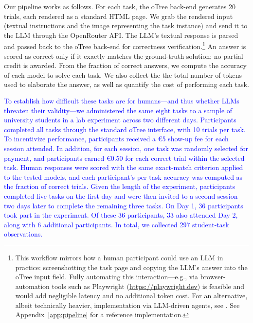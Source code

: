 \documentclass[12pt,a4paper]{article}
\newcommand{\blue}[1]{\textcolor{blue}{#1}}
\begin{document}
Our pipeline works as follows. For each task, the oTree back-end generates 20 trials, each rendered as a standard HTML page. We grab the rendered input (textual instructions and the image representing the task instance) and send it to the LLM through the OpenRouter API. The LLM's textual response is parsed and passed back to the oTree back-end for correctness 
verification.\footnote{This workflow mirrors how a human participant could use an LLM in practice: screenshotting the task page and copying the LLM's answer into the oTree input field. Fully automating this interaction---e.g., via browser-automation tools such as Playwright (\url{https://playwright.dev}) is feasible
and would add negligible latency and no additional token cost.
For an alternative, albeit technically heavier, implementation via LLM-driven agents, see \citet{celebi2026mission}. See Appendix~\ref{app:pipeline} for a reference implementation.}
An answer is scored as correct only if it exactly matches the ground-truth solution; no partial credit is awarded. From the fraction of correct answers, we compute the accuracy of each model to solve each task. We also collect the
the total number of tokens used to elaborate the answer, as well as quantify the cost of performing each task.

\blue{To establish how difficult these tasks are for humans---and thus whether LLMs threaten their validity---we administered the same eight tasks to a sample of university students in a lab experiment across two different days. Participants completed all tasks through the standard oTree interface, with 10 trials per task. To incentivize performance, participants received a €5 show-up fee for each session attended. In addition, for each session, one task was randomly selected for payment, and participants earned €0.50 for each correct trial within the selected task. Human responses were scored with the same exact-match criterion applied to the tested models, and each participant’s per-task accuracy was computed as the fraction of correct trials. Given the length of the experiment, participants completed five tasks on the first day and were then invited to a second session two days later to complete the remaining three tasks. On Day 1, 36 participants took part in the experiment. Of these 36 participants, 33 also attended Day 2, along with 6 additional participants. In total, we collected 297 student-task observations.}
\end{document}
